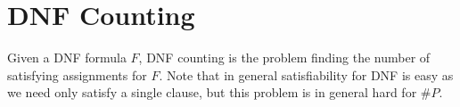 \section{DNF Counting}
Given a DNF formula $F$, DNF counting is the problem finding the number of satisfying assignments for $F$. Note that in general satisfiability for DNF is easy as we need only satisfy a single clause, but this problem is in general hard for $\# P$.